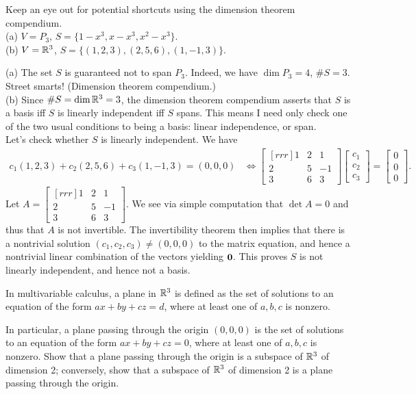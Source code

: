 Keep an eye out for potential shortcuts using the dimension theorem compendium. 
\vspace{.1in}
\\
(a) $V=P_3$, $S=\{1-x^3, x-x^3, x^2-x^3\}$. 
\\
(b) $V={\mathbb R}^3$, $S=\{(1,2,3), (2,5,6), (1,-1,3)\} $.
\\
\begin{solution}
\noindent
(a) The set $S$ is guaranteed not to span $P_3$. Indeed, we have $\dim P_3=4$, $\#S=3$. Street smarts! (Dimension theorem compendium.)
\\
(b) Since $\# S=\dim{\mathbb R}^3=3$, the dimension theorem compendium asserts that $S$ is a basis iff $S$ is linearly independent iff $S$ spans. This means I need only check one of the two usual conditions to being a basis: linear independence, or span. 
\\
Let's check whether $S$ is linearly independent. We have 
\begin{align*}
c_1(1,2,3)+c_2(2,5,6)+c_3(1,-1,3)=(0,0,0) &\Longleftrightarrow \begin{bmatrix}[rrr]
1&2&1\\ 2&5&-1\\3&6&3
\end{bmatrix}
\begin{bmatrix}
c_1\\ c_2\\ c_3
\end{bmatrix}=\begin{bmatrix}
0\\ 0\\ 0
\end{bmatrix}.
\end{align*}
Let $A=\begin{bmatrix}[rrr]
1&2&1\\ 2&5&-1\\3&6&3
\end{bmatrix}
$. We see via simple computation that $\det A=0$ and thus that $A$ is not invertible. The invertibility theorem then implies that there is a nontrivial solution $(c_1,c_2,c_3)\ne (0,0,0)$ to the matrix equation, and hence a nontrivial linear combination of the vectors yielding ${\mathbf 0}$. This proves $S$ is not linearly independent, and hence not a basis. 
\end{solution}
\ii In multivariable calculus, a plane in ${\mathbb R}^3$ is defined as the set of solutions to an equation of the form $ax+by+cz=d$, where at least one of $a, b, c$ is nonzero. 

In particular, a plane passing through the origin $(0,0,0)$ is the set of solutions to an equation of the form $ax+by+cz=0$, where at least one of $a, b, c$ is nonzero. 
\bb
\ii Show that a plane passing through the origin is a subspace of ${\mathbb R}^3$ of dimension 2; conversely, show that a subspace of ${\mathbb R}^3$ of dimension 2 is a plane passing through the origin. 

